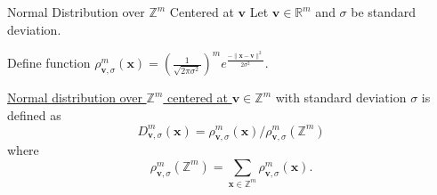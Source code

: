 \begin{frame}{Normal Distribution over $\mathbb{Z}^m$ Centered at $\mathbf{v}$}
	Let $\mathbf{v} \in \mathbb{R}^m$ and $\sigma$ be standard deviation.
	
	Define function $\rho^m_{\mathbf{v}, \sigma}(\mathbf{x}) = \left(\frac{1}{\sqrt{2\pi \sigma^2}}\right)^m e^{\frac{-\lVert\mathbf{x}-\mathbf{v}\rVert^2}{2\sigma^2}}$.
	
	\underline{Normal distribution over $\mathbb{Z}^m$ centered at $\mathbf{v} \in \mathbb{Z}^m$} with standard deviation $\sigma$ is defined as 
	\begin{equation*}
		D^m_{\mathbf{v}, \sigma}(\mathbf{x}) = \rho^m_{\mathbf{v}, \sigma}(\mathbf{x}) / \rho^m_{\mathbf{v}, \sigma}(\mathbb{Z}^m)
	\end{equation*}
	where 
	\begin{equation*}
		\rho^m_{\mathbf{v}, \sigma}(\mathbb{Z}^m) = \sum_{\mathbf{x} \in \mathbb{Z}^m}\rho^m_{\mathbf{v}, \sigma}(\mathbf{x}).
	\end{equation*}
\end{frame}